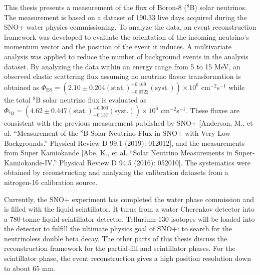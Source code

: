 \begin{doublespacing}
This thesis presents a measurement of the flux of Boron-8 ($^8$B) solar neutrinos. The measurement is based on a dataset of 190.33 live days acquired during the SNO+ water physics commissioning. To analyze the data, an event reconstruction framework was developed to evaluate the orientation of the incoming neutrino's momentum vector and the position of the event it induces. A multivariate analysis was applied to reduce the number of background events in the analysis dataset. By analyzing the data within an energy range from 5 to 15 MeV, an observed elastic scattering flux assuming no neutrino flavor transformation is obtained as $\Phi_{\mathrm{ES}}=(2.10 \pm 0.204 \mathrm{(stat.)}^{+0.169}_{-0.0722}\mathrm{(syst.)})\times10^6$ cm$^{-2}$s$^{-1}$ while the total $^8$B solar neutrino flux is evaluated as $\Phi_{\mathrm{^8B}}=(4.62 \pm 0.447 \mathrm{(stat.)}^{+0.300}_{-0.137}\mathrm{(syst.)})\times10^6$ cm$^{-2}$s$^{-1}$. These fluxes are consistent with the previous measurement published by SNO+ [Anderson, M., et al. ``Measurement of the $^8$B Solar Neutrino Flux in SNO+ with Very Low Backgrounds.'' Physical Review D 99.1 (2019): 012012], and the measurements from Super Kamiokande [Abe, K., et al. ``Solar Neutrino Measurements in Super-Kamiokande-IV.'' Physical Review D 94.5 (2016): 052010]. The systematics were obtained by reconstructing and analyzing the calibration datasets from a nitrogen-16 calibration source.

Currently, the SNO+ experiment has completed the water phase commission and is filled with the liquid scintillator. It turns from a water Cherenkov detector into a 780-tonne liquid scintillator detector. Tellurium-130 isotopes will be loaded into the detector to fulfill the ultimate physics goal of SNO+: to search for the neutrinoless double beta decay. The other parts of this thesis discuss the reconstruction framework for the partial-fill and scintillator phases. For the scintillator phase, the event reconstruction gives a high position resolution down to about 65 mm.


\end{doublespacing}
